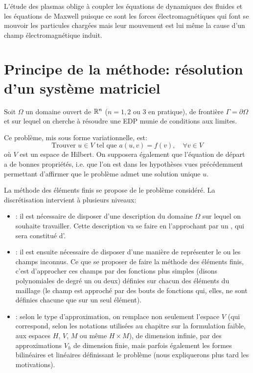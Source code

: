 L'étude des plasmas oblige à coupler les équations de dynamiques des fluides et les
équations de Maxwell puisque ce sont les forces électromagnétiques qui font se mouvoir
les particules chargées mais leur mouvement est lui même la cause d'un champ
électromagnétique induit.

\medskip
\section{Principe de la méthode: résolution d'un système matriciel}\label{Sec-mesh-carac}

Soit $\Omega$ un domaine ouvert de $\mathbb R^n$ ($n = 1, 2$ ou $3$ en pratique),
de frontière $\Gamma=\partial\Omega$ et sur lequel on cherche à résoudre une
EDP munie de conditions aux limites.

\medskip
Ce problème, mis sous forme variationnelle, est:
\begin{equation}\label{Eq-P}
\text{Trouver } u\in V \text{ tel que } a(u,v) = f(v),\quad \forall v\in V
\end{equation}
où $V$ est un espace de Hilbert.
On supposera également que l'équation de départ a de bonnes propriétés,
i.e. que l'on est dans les hypothèses vues précédemment permettant d'affirmer
que le problème admet une solution unique $u$.

\medskip
La méthode des éléments finis se propose de  le problème considéré.
La discrétisation intervient à plusieurs niveaux:
\begin{itemize}
  \item {}:
	il est nécessaire de disposer d'une description du domaine $\Omega$ sur lequel
	on souhaite travailler. Cette description va se faire en l'approchant par
	un , qui sera constitué d'.
  \item {}:
	il est ensuite nécessaire de disposer d'une manière de représenter le ou
	les champs inconnus. Ce que se proposer de faire la méthode des éléments finis, c'est d'approcher
	ces champs par des fonctions plus simples (disons polynomiales de
	degré un ou deux) définies sur chacun des éléments du maillage
	(le champ est approché par des bouts de fonctions qui, elles, ne sont définies
	chacune que sur un seul élément).
  \item {}:
	selon le type d'approximation, on remplace non seulement l'espace $V$
	(qui correspond, selon les notations utilisées au chapitre sur la formulation faible, aux espaces
	$H$, $V$, $M$ ou même $H\times M$), de dimension infinie, par des approximations $V_h$
	de dimension finie, mais parfois également les formes bilinéaires et linéaires définissant
	le problème (nous expliquerons plus tard les motivations).
\end{itemize}

